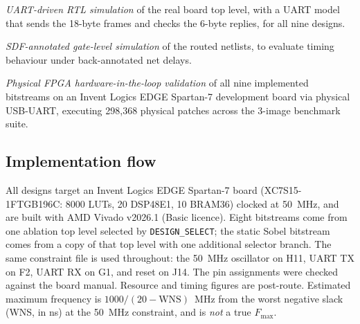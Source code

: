 \documentclass[11pt,journal,draftclsnofoot,onecolumn]{IEEEtran}
\begin{document}
\emph{UART-driven RTL simulation} of the real board top level, with a UART model that
sends the 18-byte frames and checks the 6-byte replies, for all nine designs.

\emph{SDF-annotated gate-level simulation} of the routed netlists, to evaluate timing
behaviour under back-annotated net delays.

\emph{Physical FPGA hardware-in-the-loop validation} of all nine implemented bitstreams on an
Invent Logics EDGE Spartan-7 development board via physical USB-UART, executing 298{,}368
physical patches across the 3-image benchmark suite.

\subsection{Implementation flow}\label{sec:m-impl}
All designs target an Invent Logics EDGE Spartan-7 board (XC7S15-1FTGB196C: 8000 LUTs, 20
DSP48E1, 10 BRAM36) clocked at 50~MHz, and are built with AMD Vivado v2026.1 (Basic
licence). Eight bitstreams come from one ablation top level selected by
\texttt{DESIGN\_SELECT}; the static Sobel bitstream comes from a copy of that top level
with one additional selector branch. The same constraint file is used throughout: the
50~MHz oscillator on H11, UART TX on F2, UART RX on G1, and reset on J14. The pin
assignments were checked against the board manual. Resource and timing figures are
post-route. Estimated maximum frequency is $1000/(20-\mathrm{WNS})$~MHz from the worst
negative slack (WNS, in ns) at the 50~MHz constraint, and is \emph{not} a true
$F_{\max}$.
\end{document}
